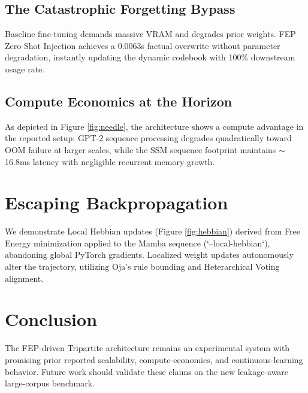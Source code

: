 \documentclass[11pt,twocolumn]{article}
\begin{document}
\subsection{The Catastrophic Forgetting Bypass}
Baseline fine-tuning demands massive VRAM and degrades prior weights. FEP Zero-Shot Injection achieves a 0.0063s factual overwrite without parameter degradation, instantly updating the dynamic codebook with 100\% downstream usage rate.

\subsection{Compute Economics at the Horizon}
As depicted in Figure \ref{fig:needle}, the architecture shows a compute advantage in the reported setup: GPT-2 sequence processing degrades quadratically toward OOM failure at larger scales, while the SSM sequence footprint maintains $\sim$16.8ms latency with negligible recurrent memory growth.

\section{Escaping Backpropagation}
We demonstrate Local Hebbian updates (Figure \ref{fig:hebbian}) derived from Free Energy minimization applied to the Mamba sequence (`--local-hebbian`), abandoning global PyTorch gradients. Localized weight updates autonomously alter the trajectory, utilizing Oja's rule bounding and Heterarchical Voting alignment.

\section{Conclusion}
The FEP-driven Tripartite architecture remains an experimental system with promising prior reported scalability, compute-economics, and continuous-learning behavior. Future work should validate these claims on the new leakage-aware large-corpus benchmark.
\end{document}
